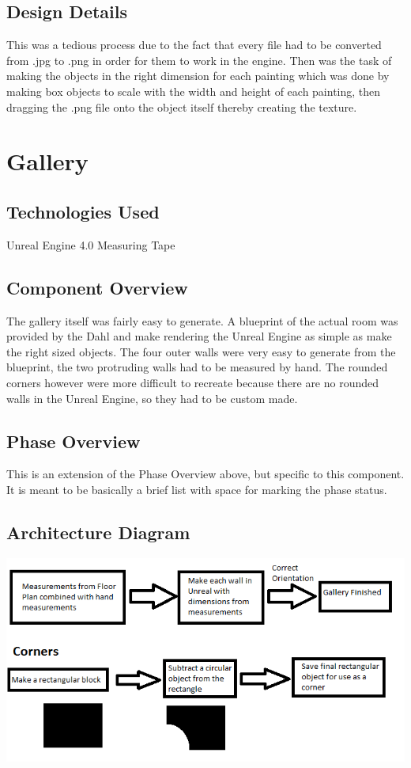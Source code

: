 \subsection{Design Details}
This was a tedious process due to the fact that every file had to be converted from .jpg to .png in order for them to work in the engine.  Then was the task of making the objects in the right dimension for each painting which was done by making box objects to scale with the width and height of each painting, then dragging the .png file onto the object itself thereby creating the texture.


\section{Gallery }

\subsection{Technologies  Used}
Unreal Engine 4.0
Measuring Tape

\subsection{Component  Overview}
The gallery itself was fairly easy to generate.  A blueprint of the actual room was provided by the Dahl and make rendering the Unreal Engine as simple as make the right sized objects.  The four outer walls were very easy to generate from the blueprint, the two protruding walls had to be measured by hand. The rounded corners however were more difficult to recreate because there are no rounded walls in the Unreal Engine, so they had to be custom made.  

\subsection{Phase Overview}
This is an extension of the Phase Overview above, but specific to this component. 
 It is meant to be basically a brief list with space for marking the phase status. 

\subsection{ Architecture  Diagram}
\includegraphics[scale=1.0]{Diagrams/GalleryDiagram.png}


